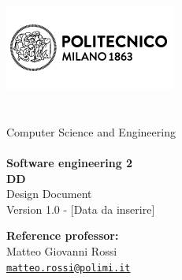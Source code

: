 \makeatletter
\begin{titlepage}
    \begin{center} 
		\includegraphics[width=0.5\linewidth]{resources/images/logo_polimi.png}\\[4ex]
		{\Huge \bfseries \sffamily \@title }\\[4ex] 
		{\Large  \@author}\\[2ex] 
		Computer Science and Engineering\\[5ex]
		\@date\\[5ex]
		\begingroup
            \fontsize{15pt}{12pt}\selectfont
            \textbf{Software engineering 2}
        \endgroup\\[3ex]
        \begingroup
            \fontsize{20pt}{12pt}\selectfont
            \textbf{DD}\\[1ex]
            \fontsize{15pt}{12pt}\selectfont
            Design Document
        \endgroup\\[8ex]
	    Version 1.0 - [Data da inserire]
	\end{center}
	
	\vspace*{\fill}
	\begin{flushright}
	    \textbf{Reference professor:}\\[0.2cm]
	    Matteo Giovanni Rossi\\[0cm]
        {\small \href{mailto:matteo.rossi@polimi.it}{\texttt{matteo.rossi@polimi.it}}}
	\end{flushright}
\end{titlepage}
\makeatother
\thispagestyle{empty}
\setcounter{page}{1} %